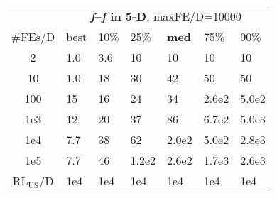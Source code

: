 \begin{tabular}{c|llllll}
 & \multicolumn{6}{|c}{\textbf{\textit{f}\raisebox{-0.35ex}{1}--\textit{f}\raisebox{-0.35ex}{24} in 5-D}, maxFE/D=10000}\\
\#FEs/D & best & 10\% & 25\% & \textbf{med} & 75\% & 90\%\\
2 & \hspace*{1ex}1.0 & \hspace*{1ex}3.6 & 10 & 10 & 10 & 10\\
10 & \hspace*{1ex}1.0 & 18 & 30 & 42 & 50 & 50\\
100 & 15 & 16 & 24 & 34 & 2.6e2 & 5.0e2\\
1e3 & 12 & 20 & 37 & 86 & 6.7e2 & 5.0e3\\
1e4 & \hspace*{1ex}7.7 & 38 & 62 & 2.0e2 & 5.0e2 & 2.8e3\\
1e5 & \hspace*{1ex}7.7 & 46 & 1.2e2 & 2.6e2 & 1.7e3 & 2.6e3\\
$\text{RL}_{\text{US}}$/D & 1e4 & 1e4 & 1e4 & 1e4 & 1e4 & 1e4
\end{tabular}
